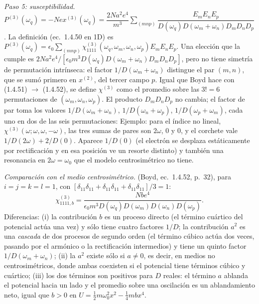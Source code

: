 \emph{Paso 5: susceptibilidad.} $P^{(3)}(\omega_q)=-Nex^{(3)}(\omega_q)=\dfrac{2Na^2e^4}{m^3}\sum_{(mnp)}\dfrac{E_mE_nE_p}{D(\omega_q)D(\omega_m+\omega_n)D_mD_nD_p}$. La definición (ec.~1.4.50 en 1D) es $P^{(3)}(\omega_q)=\epsilon_0\sum_{(mnp)}\chi^{(3)}_{1111}(\omega_q,\omega_m,\omega_n,\omega_p)E_mE_nE_p$. Una elección que la cumple es $2Na^2e^4/[\epsilon_0m^3D(\omega_q)D(\omega_m+\omega_n)D_mD_nD_p]$, pero no tiene simetría de permutación intrínseca: el factor $1/D(\omega_m+\omega_n)$ distingue el par $(m,n)$, que se sumó primero en $x^{(2)}$, del tercer campo $p$. Igual que Boyd hace con (1.4.51) $\to$ (1.4.52), se define $\chi^{(3)}$ como el promedio sobre las $3!=6$ permutaciones de $(\omega_m,\omega_n,\omega_p)$. El producto $D_mD_nD_p$ no cambia; el factor de par toma los valores $1/D(\omega_m+\omega_n)$, $1/D(\omega_n+\omega_p)$, $1/D(\omega_p+\omega_m)$, cada uno en dos de las seis permutaciones:
Ejemplo: para el índice no lineal, $\chi^{(3)}(\omega;\omega,\omega,-\omega)$, las tres sumas de pares son $2\omega$, $0$ y $0$, y el corchete vale $1/D(2\omega)+2/D(0)$. Aparece $1/D(0)$ (el electrón se desplaza estáticamente por rectificación y en esa posición ve un resorte distinto) y también una resonancia en $2\omega=\omega_0$ que el modelo centrosimétrico no tiene.

\emph{Comparación con el medio centrosimétrico.} (Boyd, ec.~1.4.52, p.~32), para $i=j=k=l=1$, con $[\delta_{11}\delta_{11}+\delta_{11}\delta_{11}+\delta_{11}\delta_{11}]/3=1$:
\[
\chi^{(3)}_{1111,b}=\frac{Nbe^4}{\epsilon_0m^3D(\omega_q)D(\omega_m)D(\omega_n)D(\omega_p)}.
\]
Diferencias: (i) la contribución $b$ es un proceso directo (el término cuártico del potencial actúa una vez) y sólo tiene cuatro factores $1/D$; la contribución $a^2$ es una \emph{cascada} de dos procesos de segundo orden (el término cúbico actúa dos veces, pasando por el armónico o la rectificación intermedios) y tiene un quinto factor $1/D(\omega_m+\omega_n)$; (ii) la $a^2$ existe sólo si $a\neq0$, es decir, en medios no centrosimétricos, donde ambas coexisten si el potencial tiene términos cúbico y cuártico; (iii) los dos términos son positivos para $D$ reales: el término $a$ ablanda el potencial hacia un lado y el promedio sobre una oscilación es un ablandamiento neto, igual que $b>0$ en $U=\tfrac12m\omega_0^2x^2-\tfrac14mbx^4$.

